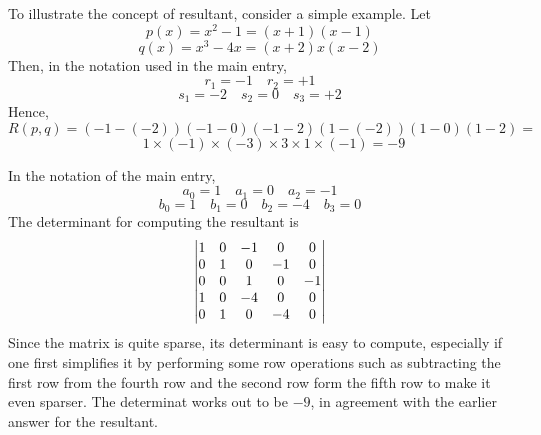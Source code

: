 \documentclass[12pt]{article}
\begin{document}
To illustrate the concept of resultant, consider a simple example. Let
 $$p(x) = x^2 - 1 = (x+1)(x-1)$$
 $$q(x) = x^3 - 4 x = (x+2) x (x-2)$$
Then, in the notation used in the main entry,
 $$r_1 = -1 \quad r_2 = +1$$
 $$s_1 = -2 \quad s_2 = 0 \quad s_3 = +2$$
Hence,
 $$R(p,q) = (-1-(-2)) (-1-0) (-1-2) (1-(-2)) (1-0) (1-2) =$$
 $$\qquad 1 \times (-1) \times (-3) \times 3 \times 1 \times (-1) = -9$$

In the notation of the main entry,
 $$a_0 = 1 \quad a_1 = 0 \quad a_2 = -1$$
 $$b_0 = 1 \quad b_1 = 0 \quad b_2 = -4 \quad b_3 = 0$$
The determinant for computing the resultant is
 $$\left| \begin{matrix}
1 &  0 & -1 &  0 &  0 \cr
0 &  1 &  0 & -1 &  0 \cr
0 &  0 &  1 &  0 & -1 \cr
1 &  0 & -4 &  0 &  0 \cr
0 &  1 &  0 & -4 &  0 \cr
\end{matrix} \right|$$
Since the matrix is quite sparse, its determinant is easy to compute, especially if one first simplifies it by performing some row operations such as subtracting the first row from the fourth row and the second row form the fifth row to make it even sparser.  The determinat works out to be $-9$, in agreement with the earlier answer for the resultant.
\end{document}
